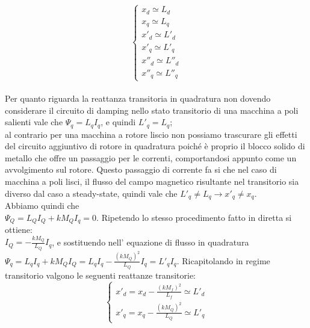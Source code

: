 \documentclass[Lau,noexaminfo]{sapthesis}
\begin{document}
	\[
	\begin{cases}
	x_d\simeq L_d\\
	x_q\simeq L_q\\
	x'_d\simeq L'_d\\
	x'_q\simeq L'_q\\
	x''_d\simeq L''_d\\
	x''_q\simeq L''_q
	\end{cases}
	\]\\
	Per quanto riguarda la reattanza transitoria in quadratura non dovendo considerare il circuito di damping nello stato transitorio di una macchina a poli salienti vale che
	$\Psi_q=L_qI_q$, e quindi $L'_q=L_q$;\\
	al contrario per una macchina a rotore liscio non possiamo trascurare gli effetti del circuito aggiuntivo di rotore in quadratura poiché è proprio il blocco solido di metallo che offre un passaggio per le correnti, comportandosi appunto come un avvolgimento sul rotore. Questo passaggio di corrente fa si che nel caso di macchina a poli lisci, il flusso del campo magnetico risultante nel transitorio sia diverso dal caso a steady-state, quindi vale che $L'_q\ne L_q \rightarrow x'_q\ne x_q$.\\
	Abbiamo quindi che\\ 
	$\Psi_Q=L_QI_Q+kM_QI_q=0$. Ripetendo lo stesso procedimento fatto in diretta si ottiene:\\
	$I_Q=-\frac{kM_Q}{L_Q}I_q $, e sostituendo nell' equazione di flusso in quadratura\\
	$\Psi_q=L_qI_q+kM_QI_Q=L_qI_q-\frac{(kM_Q)^2}{L_Q}I_q=L'_qI_q$. Ricapitolando in regime transitorio valgono le seguenti reattanze transitorie:\\
	\[
	\begin{cases}
	x'_d=x_d-\frac{(kM_f)^2}{L_f}\simeq L'_d\\
	x'_q=x_q-\frac{(kM_Q)^2}{L_Q}\simeq L'_q
	\end{cases}
	\]
\end{document}
